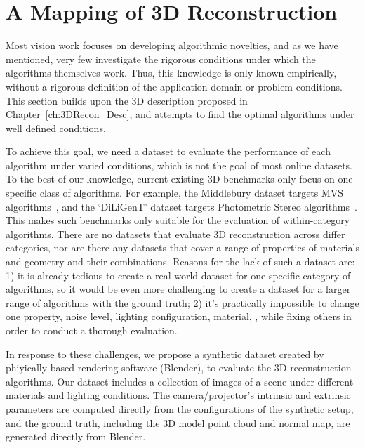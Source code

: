 
\chapter{A Mapping of 3D Reconstruction}
\label{ch:3DRecon_Mapping}
Most vision work focuses on developing algorithmic novelties, and as we have mentioned, very few investigate the rigorous conditions under which the algorithms themselves work. Thus, this knowledge is only known empirically, without a rigorous definition of the application domain or problem conditions. This section builds upon the 3D description proposed in Chapter~\ref{ch:3DRecon_Desc}, and attempts to find the optimal algorithms under well defined conditions.

To achieve this goal, we need a dataset to evaluate the performance of each algorithm under varied conditions, which is not the goal of most online datasets. To the best of our knowledge, current existing 3D benchmarks only focus on one specific class of algorithms. For example, the Middlebury dataset targets MVS algorithms~\cite{seitz2006comparison}, and the `DiLiGenT' dataset targets Photometric Stereo algorithms~\cite{shi2016benchmark}. This makes such benchmarks only suitable for the evaluation of within-category algorithms. There are no datasets that evaluate 3D reconstruction across differ categories, nor are there any datasets that cover a range of properties of materials and geometry and their combinations. Reasons for the lack of such a dataset are: 1) it is already tedious to create a real-world dataset for one specific category of algorithms, so it would be even more challenging to create a dataset for a larger range of algorithms with the ground truth; 2) it's practically impossible to change one property, \eg noise level, lighting configuration, material, \etc, while fixing others in order to conduct a thorough evaluation.

In response to these challenges, we propose a synthetic dataset created by phiyically-based rendering software (Blender), to evaluate the 3D reconstruction algorithms. Our dataset includes a collection of images of a scene under different materials and lighting conditions. The camera/projector's intrinsic and extrinsic parameters are computed directly from the configurations of the synthetic setup, and the ground truth, including the 3D model point cloud and normal map, are generated directly from Blender.

